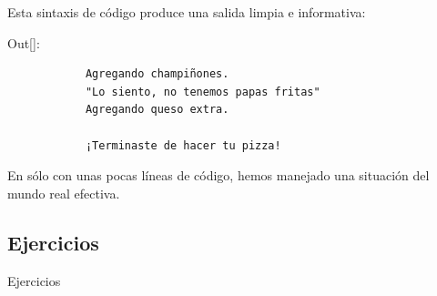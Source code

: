 Esta sintaxis de código produce una salida limpia e informativa:\vspace{0.08cm}

{\ttfamily\scriptsize\noindent Out[]:
	\vspace{-0.3cm}
	{\color{blue}		
		\begin{verbatim}
			Agregando champiñones.
			"Lo siento, no tenemos papas fritas"
			Agregando queso extra.
			
			¡Terminaste de hacer tu pizza!
		\end{verbatim}
	}
}

En sólo con unas pocas líneas de código, hemos manejado una situación del mundo real efectiva.

\subsection{Ejercicios}

Ejercicios 

